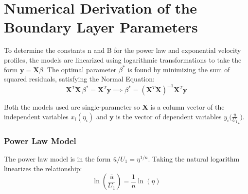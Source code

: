 \documentclass{article}
\begin{document}
\begin{table}[H]
\begin{tabularx}{\textwidth}{l X l l}

        \bottomrule
    \end{tabularx}
\end{table}

\section{Numerical Derivation of the Boundary Layer Parameters}
\label{app:least squares method}

To determine the constants n and B for the power law and exponential velocity profiles, the models are linearized using logarithmic transformations to take the form $\mathbf{y} = \mathbf{X}\beta$. The optimal parameter $\beta^*$ is found by minimizing the sum of squared residuals, satisfying the Normal Equation:
\begin{equation*}
    \mathbf{X}^{T}\mathbf{X}\,\beta^* = \mathbf{X}^{T}\mathbf{y} \implies \beta^* = (\mathbf{X}^{T}\mathbf{X})^{-1}\mathbf{X}^{T}\mathbf{y}
\end{equation*}

Both the models used are single-parameter so $\mathbf{X}$ is a column vector of the independent variables $x_i(\eta_i)$ and $\mathbf{y}$ is the vector of dependent variables $y_i\bigg( \frac{\bar{u}}{U_1}_i\bigg)$.

\subsubsection{Power Law Model}

The power law model is in the form $\bar{u}/U_1=\eta^{1/n}$. Taking the natural logarithm linearizes the relationship:
\begin{equation*}
    \ln\left(\frac{\bar{u}}{U_1}\right) = \frac{1}{n} \ln(\eta)
\end{equation*}
\end{document}
